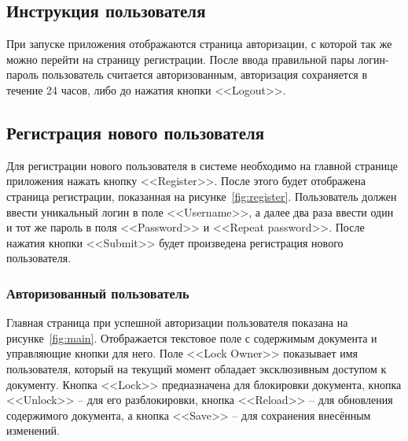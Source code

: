 \subsection{Инструкция пользователя}
При запуске приложения отображаются страница авторизации, с которой так же можно перейти на страницу регистрации. После ввода правильной пары логин-пароль пользователь считается авторизованным, авторизация сохраняется в течение 24 часов, либо до нажатия кнопки <<Logout>>.

\subsection{Регистрация нового пользователя}
Для регистрации нового пользователя в системе необходимо на главной странице приложения нажать кнопку <<Register>>. После этого будет отображена страница регистрации, показанная на рисунке~\ref{fig:register}.
Пользователь должен ввести уникальный логин в поле <<Username>>, а далее два раза ввести один и тот же пароль в поля <<Password>> и <<Repeat password>>. После нажатия кнопки <<Submit>> будет произведена регистрация нового пользователя. 

\subsubsection{Авторизованный пользователь}
Главная страница при успешной авторизации пользователя показана на рисунке~\ref{fig:main}. Отображается текстовое поле с содержимым документа и управляющие кнопки для него. Поле <<Lock Owner>> показывает имя пользователя, который на текущий момент обладает эксклюзивным доступом к документу. Кнопка <<Lock>> предназначена для блокировки документа, кнопка <<Unlock>> -- для его разблокировки, кнопка <<Reload>> -- для обновления содержимого документа, а кнопка <<Save>> -- для сохранения внесённым изменений.